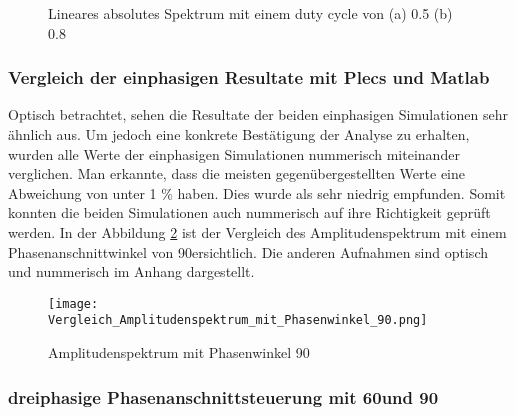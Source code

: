 \begin{figure}[ht!]
	\centering
	\qquad
	\caption{Lineares absolutes Spektrum mit einem duty cycle von (a) 0.5 (b) 0.8}
	\label{fig:plecs_Schwingungspakete_absolut log}
\end{figure}

\subsubsection{Vergleich der einphasigen Resultate mit Plecs und Matlab}

Optisch betrachtet, sehen die Resultate der beiden einphasigen Simulationen sehr ähnlich aus. Um jedoch eine konkrete Bestätigung der Analyse zu erhalten, wurden alle Werte der einphasigen Simulationen nummerisch miteinander verglichen. Man erkannte, dass die meisten gegenübergestellten Werte eine Abweichung von unter 1 \% haben. Dies wurde als sehr niedrig empfunden. Somit konnten die beiden Simulationen auch nummerisch auf ihre Richtigkeit geprüft werden. In der Abbildung \ref{fig:Amplitudenspektrum mit Phasenwinkel 90grad} ist der Vergleich des Amplitudenspektrum mit einem Phasenanschnittwinkel von 90\textdegree ersichtlich. Die anderen Aufnahmen sind optisch und nummerisch im Anhang dargestellt.



\begin{figure}[ht!]
	\centering
	\texttt{[image: Vergleich\_Amplitudenspektrum\_mit\_Phasenwinkel\_90.png]}	
	\caption{Amplitudenspektrum mit Phasenwinkel 90\textdegree}
	\label{fig:Amplitudenspektrum mit Phasenwinkel 90grad}
\end{figure}









\newpage

\subsubsection*{dreiphasige Phasenanschnittsteuerung mit 60\textdegree und 90\textdegree}


